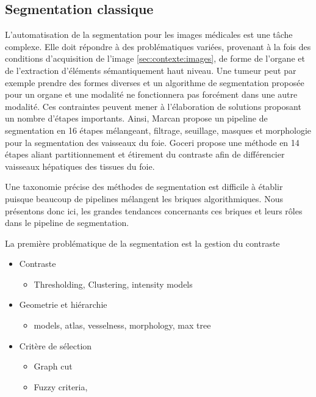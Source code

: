 \subsection{Segmentation classique}
\label{sec:EA:segmentation_historique}
% 
L'automatisation de la segmentation pour les images médicales est une tâche complexe. Elle doit répondre à des problématiques variées, provenant à la fois des conditions d'acquisition de l'image \ref{sec:contexte:images}, de forme de l'organe et de l'extraction d'éléments sémantiquement haut niveau. Une tumeur peut par exemple prendre des formes diverses et un algorithme de segmentation proposée pour un organe et une modalité ne fonctionnera pas forcément dans une autre modalité. Ces contraintes peuvent mener à l'élaboration de solutions proposant un nombre d'étapes importants. Ainsi, Marcan \cite{Marcan_2014_vessel_seg} propose un pipeline de segmentation en 16 étapes mélangeant, filtrage, seuillage, masques et morphologie pour la segmentation des vaisseaux du foie. Goceri \cite{Goceri2017_vessel} propose une méthode en 14 étapes aliant partitionnement et étirement du contraste afin de différencier vaisseaux hépatiques des tissues du foie.

Une taxonomie précise des méthodes de segmentation est difficile à établir puisque beaucoup de pipelines mélangent les briques algorithmiques. Nous présentons donc ici, les grandes tendances concernants ces briques et leurs rôles dans le pipeline de segmentation.

La première problématique de la segmentation est la gestion du contraste


\begin{itemize}
  \item{Contraste}
     \begin{itemize}
        \item{Thresholding, Clustering, intensity models}
     \end{itemize}
   \item{Geometrie et hiérarchie}
     \begin{itemize}
        \item{models, atlas, vesselness, morphology, max tree}
     \end{itemize}
\item{Critère de sélection}
  \begin{itemize}
  \item{Graph cut}
  \item{Fuzzy criteria,}
  \end{itemize}
\end{itemize}



